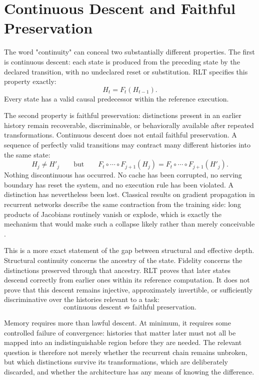 \documentclass[11pt]{article}
\begin{document}
\section{Continuous Descent and Faithful Preservation}

The word "continuity" can conceal two substantially different properties. The first is continuous descent: each state is produced from the preceding state by the declared transition, with no undeclared reset or substitution. RLT specifies this property exactly:
\[
H_t = F_t(H_{t-1}).
\]
Every state has a valid causal predecessor within the reference execution.

The second property is faithful preservation: distinctions present in an earlier history remain recoverable, discriminable, or behaviorally available after repeated transformations. Continuous descent does not entail faithful preservation. A sequence of perfectly valid transitions may contract many different histories into the same state:
\[
H_j \neq H'_j
\qquad\text{but}\qquad
F_t\circ\cdots\circ F_{j+1}(H_j)
=
F_t\circ\cdots\circ F_{j+1}(H'_j).
\]
Nothing discontinuous has occurred. No cache has been corrupted, no serving boundary has reset the system, and no execution rule has been violated. A distinction has nevertheless been lost. Classical results on gradient propagation in recurrent networks describe the same contraction from the training side: long products of Jacobians routinely vanish or explode, which is exactly the mechanism that would make such a collapse likely rather than merely conceivable \cite{bengio1994longterm,pascanu2013difficulty}.

This is a more exact statement of the gap between structural and effective depth. Structural continuity concerns the ancestry of the state. Fidelity concerns the distinctions preserved through that ancestry. RLT proves that later states descend correctly from earlier ones within its reference computation. It does not prove that this descent remains injective, approximately invertible, or sufficiently discriminative over the histories relevant to a task:
\[
\text{continuous descent} \;\not\Rightarrow\; \text{faithful preservation.}
\]

Memory requires more than lawful descent. At minimum, it requires some controlled failure of convergence: histories that matter later must not all be mapped into an indistinguishable region before they are needed. The relevant question is therefore not merely whether the recurrent chain remains unbroken, but which distinctions survive its transformations, which are deliberately discarded, and whether the architecture has any means of knowing the difference.
\end{document}
